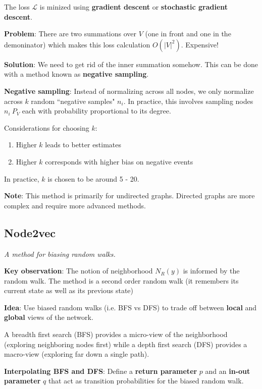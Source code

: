 \documentclass[12pt]{article}
\begin{document}
The loss $\mathcal{L}$ is minized using \textbf{gradient descent} or
\textbf{stochastic gradient descent}.

\medskip
\textbf{Problem}: There are two summations over $V$ (one in front and one in the
demoninator) which makes this loss calculation $O(|V|^2)$. Expensive!

\textbf{Solution}: We need to get rid of the inner summation somehow. This can be
done with a method known as \textbf{negative sampling}.

\medskip
\textbf{Negative sampling}: Instead of normalizing across all nodes, we only
normalize across $k$ random ``negative samples" $n_i$. In practice, this involves
sampling nodes $n_i ~ P_V$ each with probability proportional to its degree.


\smallskip
Considerations for choosing $k$:
\begin{enumerate}
  \item Higher $k$ leads to better estimates
  \item Higher $k$ corresponds with higher bias on negative events 
\end{enumerate}
In practice, $k$ is chosen to be around 5 - 20.

\medskip
\textbf{Note}: This method is primarily for undirected graphs. Directed graphs
are more complex and require more advanced methods.

\subsection*{Node2vec}

\textit{A method for biasing random walks.}

\medskip
\textbf{Key observation}: The notion of neighborhood $N_R(y)$ is informed by the
random walk. The method is a second order random walk (it remembers its current
state as well as its previous state)

\medskip
\textbf{Idea}: Use biased random walks (i.e. BFS vs DFS) to trade off
between \textbf{local} and \textbf{global} views of the network.

A breadth first search (BFS) provides a micro-view of the neighborhood
(exploring neighboring nodes first) while a depth first search (DFS) provides a
macro-view (exploring far down a single path).

\medskip
\textbf{Interpolating BFS and DFS}: Define a \textbf{return parameter} $p$ and
an \textbf{in-out parameter} $q$ that act as transition probabilities for the
biased random walk.
\end{document}
